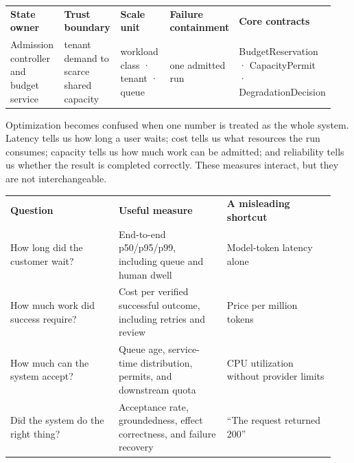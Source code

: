 
\BookTableStart
\fontsize{7.2}{9}\selectfont
\begin{tabular}{@{}Y{0.1880\linewidth}Y{0.1880\linewidth}Y{0.1880\linewidth}Y{0.1880\linewidth}Y{0.1880\linewidth}@{}}
\color{white}\bfseries \textbf{State owner} & \color{white}\bfseries \textbf{Trust boundary} & \color{white}\bfseries \textbf{Scale unit} & \color{white}\bfseries \textbf{Failure containment} & \color{white}\bfseries \textbf{Core contracts} \\
Admission controller and budget service & tenant demand to scarce shared capacity & workload class · tenant · queue & one admitted run & BudgetReservation · CapacityPermit · DegradationDecision \\
\end{tabular}
\BookTableEnd

Optimization becomes confused when one number is treated as the whole system. Latency tells us how long a user waits; cost tells us what resources the run consumes; capacity tells us how much work can be admitted; and reliability tells us whether the result is completed correctly. These measures interact, but they are not interchangeable.\par

\BookTableStart
\small
\begin{tabular}{@{}Y{0.3133\linewidth}Y{0.3133\linewidth}Y{0.3133\linewidth}@{}}
\color{white}\bfseries \textbf{Question} & \color{white}\bfseries \textbf{Useful measure} & \color{white}\bfseries \textbf{A misleading shortcut} \\
How long did the customer wait? & End-to-end p50/p95/p99, including queue and human dwell & Model-token latency alone \\
How much work did success require? & Cost per verified successful outcome, including retries and review & Price per million tokens \\
How much can the system accept? & Queue age, service-time distribution, permits, and downstream quota & CPU utilization without provider limits \\
Did the system do the right thing? & Acceptance rate, groundedness, effect correctness, and failure recovery & “The request returned 200” \\
\end{tabular}
\BookTableEnd

